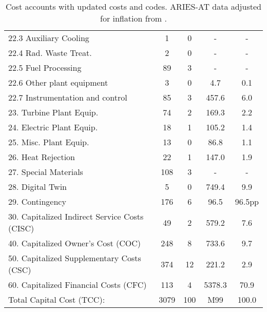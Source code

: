 \begin{table}[h!]
{\begin{tabular}{lcccc}
\hspace{10mm}22.3 Auxiliary Cooling & 1 & 0 & - & - \\
\hspace{10mm}22.4 Rad. Waste Treat. & 2 & 0 & - & - \\
\hspace{10mm}22.5 Fuel Processing & 89 & 3 & - & - \\
\hspace{10mm}22.6 Other plant equipment & 3 & 0 & 4.7 & 0.1 \\
\hspace{10mm}22.7 Instrumentation and control & 85 & 3 & 457.6 & 6.0 \\
\hspace{5mm}23. Turbine Plant Equip. & 74 & 2 & 169.3 & 2.2 \\
\hspace{5mm}24. Electric Plant Equip. & 18 & 1 & 105.2 & 1.4 \\
\hspace{5mm}25. Misc. Plant Equip. & 13 & 0 & 86.8 & 1.1 \\
\hspace{5mm}26. Heat Rejection & 22 & 1 & 147.0 & 1.9 \\
\hspace{5mm}27. Special Materials & 108 & 3 & - & - \\
\hspace{5mm}28. Digital Twin & 5 & 0 & 749.4 & 9.9 \\
\hspace{5mm}29. Contingency & 176 & 6 & 96.5 & 96.5pp \\
30. Capitalized Indirect Service Costs (CISC) & 49 & 2 & 579.2 & 7.6 \\
40. Capitalized Owner’s Cost (COC) & 248 & 8 & 733.6 & 9.7 \\
50. Capitalized Supplementary Costs (CSC) & 374 & 12 & 221.2 & 2.9 \\
60. Capitalized Financial Costs (CFC) & 113 & 4 & 5378.3 & 70.9 \\
\hline
Total Capital Cost (TCC): & 3079 & 100 & M99 & 100.0 \\
\hline
\end{tabular}
}
\caption{Cost accounts with updated costs and codes. ARIES-AT data adjusted for inflation from \cite{gordon1986mirror}.}
\label{tab:costs_updated_codes}
\end{table}


